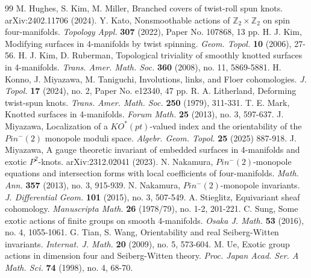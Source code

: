 \documentclass{amsart}
\theoremstyle{definition}
\theoremstyle{remark}
\numberwithin{equation}{section}
\begin{document}
\begin{thebibliography}{99}
M. Hughes, S. Kim, M. Miller, Branched covers of twist-roll spun knots. arXiv:2402.11706 (2024).
Y. Kato, Nonsmoothable actions of $\mathbb{Z}_2 \times \mathbb{Z}_2$ on spin four-manifolds. {\em Topology Appl.} {\bf 307} (2022), Paper No. 107868, 13 pp. 
H. J. Kim, Modifying surfaces in 4-manifolds by twist spinning. {\em Geom. Topol.} {\bf 10} (2006), 27-56.
H. J. Kim, D. Ruberman, Topological triviality of smoothly knotted surfaces in 4-manifolds. {\em Trans. Amer. Math. Soc.} {\bf 360} (2008), no. 11, 5869-5881.
H. Konno, J. Miyazawa, M. Taniguchi, Involutions, links, and Floer cohomologies. {\em J. Topol.} {\bf 17} (2024), no. 2, Paper No. e12340, 47 pp.
R. A. Litherland, Deforming twist-spun knots. {\em Trans. Amer. Math. Soc.} {\bf 250} (1979), 311-331. 
T. E. Mark, Knotted surfaces in 4-manifolds. {\em Forum Math.} {\bf 25} (2013), no. 3, 597-637.
J. Miyazawa, Localization of a $KO^*(pt)$-valued index and the orientability of the $Pin^-(2)$ monopole moduli space. {\em Algebr. Geom. Topol.} {\bf 25} (2025) 887-918.
J. Miyazawa, A gauge theoretic invariant of embedded surfaces in 4-manifolds and exotic $P^2$-knots. arXiv:2312.02041 (2023).
N. Nakamura, $Pin^-(2)$-monopole equations and intersection forms with local coefficients of four-manifolds. {\em Math. Ann.} {\bf 357} (2013), no. 3, 915-939. 
N. Nakamura, $Pin^-(2)$-monopole invariants. {\em J. Differential Geom.} {\bf 101} (2015), no. 3, 507-549.
A. Stieglitz, Equivariant sheaf cohomology. {\em Manuscripta Math.} {\bf 26} (1978/79), no. 1-2, 201-221. 
C. Sung, Some exotic actions of finite groups on smooth 4-manifolds. {\em Osaka J. Math.} {\bf 53} (2016), no. 4, 1055-1061.
G. Tian, S. Wang, Orientability and real Seiberg-Witten invariants. {\em Internat. J. Math.} {\bf 20} (2009), no. 5, 573-604. 
M. Ue, Exotic group actions in dimension four and Seiberg-Witten theory. {\em Proc. Japan Acad. Ser. A Math. Sci.} {\bf 74} (1998), no. 4, 68-70.
\end{thebibliography}
\end{document}
